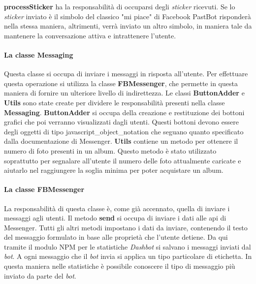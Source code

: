 \textbf{processSticker} ha la responsabilità di occuparsi degli \textit{sticker}
ricevuti. Se lo \textit{sticker} inviato è il simbolo del classico "mi piace"
di Facebook PastBot risponderà nella stessa maniera, altrimenti, verrà inviato
un altro simbolo, in maniera tale da mantenere la conversazione attiva e
intrattenere l'utente.

\paragraph*{La classe Messaging} Questa classe si occupa di inviare i messaggi
in risposta all'utente. Per effettuare questa operazione si utilizza la classe
\textbf{FBMessenger}, che permette in questa maniera di fornire un ulteriore
livello di indirettezza. Le classi \textbf{ButtonAdder} e \textbf{Utils} sono
state create per dividere le responsabilità presenti nella classe
\textbf{Messaging}. \textbf{ButtonAdder} si occupa della creazione e
restituzione dei bottoni grafici che poi verranno visualizzati dagli utenti.
Questi bottoni devono essere degli oggetti di tipo
\gls{javascript_object_notation} che seguano quanto specificato dalla
documentazione di Messenger.
\textbf{Utils} contiene un metodo per ottenere il numero di foto presenti in un
album. Questo metodo è stato utilizzato soprattutto per segnalare all'utente il
numero delle foto attualmente caricate e aiutarlo nel raggiungere la soglia
minima per poter acquistare un album.

\paragraph*{La classe FBMessenger} La responsabilità di questa classe è, come
già accennato, quella di inviare i messaggi agli utenti. Il metodo
\textbf{send} si occupa di inviare i dati alle \gls{api} di Messenger. Tutti gli
altri metodi impostano i dati da inviare, contenendo il testo del messaggio
formulato in base alle proprietà che l'utente detiene. Da qui tramite il modulo
NPM per le statistiche \textit{Dashbot} si salvano i messaggi inviati dal
\textit{bot}. A ogni messaggio che il \textit{bot} invia si applica un tipo
particolare di etichetta. In questa maniera nelle statistiche è possibile
conoscere il tipo di messaggio più inviato da parte del \textit{bot}.
